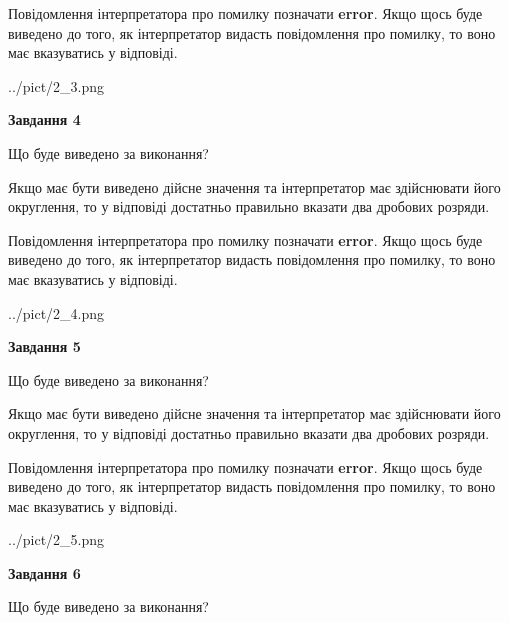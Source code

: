 \documentclass[12pt, ukrainian]{article}
\begin{document}
{\begin {Large}
Повідомлення інтерпретатора про помилку позначати \textbf{error}.
Якщо щось буде виведено до того, як інтерпретатор видасть повідомлення про помилку, 
то воно має вказуватись у відповіді. \par

\begin{center}
	{../pict/2_3.png}
\end{center}
\newpage

{\begin {center}\textbf{Завдання 4}\end {center}}\par
Що буде виведено за виконання? \par

Якщо має бути виведено дійсне значення та інтерпретатор має здійснювати його округлення, 
то у відповіді достатньо правильно вказати два дробових розряди.

Повідомлення інтерпретатора про помилку позначати \textbf{error}.
Якщо щось буде виведено до того, як інтерпретатор видасть повідомлення про помилку, 
то воно має вказуватись у відповіді. \par

\begin{center}
	{../pict/2_4.png}
\end{center}
\newpage

{\begin {center}\textbf{Завдання 5}\end {center}}\par
Що буде виведено за виконання? \par

Якщо має бути виведено дійсне значення та інтерпретатор має здійснювати його округлення, 
то у відповіді достатньо правильно вказати два дробових розряди.

Повідомлення інтерпретатора про помилку позначати \textbf{error}.
Якщо щось буде виведено до того, як інтерпретатор видасть повідомлення про помилку, 
то воно має вказуватись у відповіді. \par

\begin{center}
	{../pict/2_5.png}
\end{center}
\newpage

{\begin {center}\textbf{Завдання 6}\end {center}}\par
Що буде виведено за виконання? \par


\end{Large}}
\end{document}
